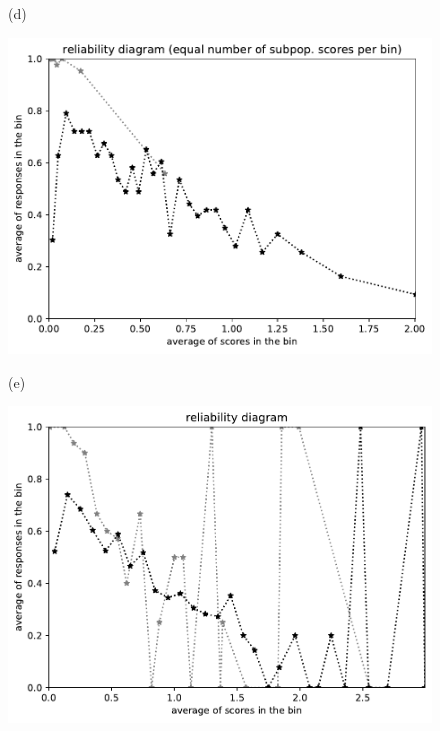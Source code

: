 \documentclass{article}
\newlength{\vertsep}
\newlength{\imsize}
\begin{document}
\begin{figure}
\begin{centering}
(d)
\parbox{\imsize}{\includegraphics[width=\imsize]
{../codes/unweighted/nll-1-60-night-snake-Hypsiglena-torquata_323-monarch-monarch-butterfly-milkweed-butterfly-Danaus-plexippusequisamps30.pdf}}
\quad\quad
(e)
\parbox{\imsize}{\includegraphics[width=\imsize]
{../codes/unweighted/nll-1-60-night-snake-Hypsiglena-torquata_323-monarch-monarch-butterfly-milkweed-butterfly-Danaus-plexippusequiscore30.pdf}}

\vspace{\vertsep}


\end{centering}
\end{figure}
\end{document}
